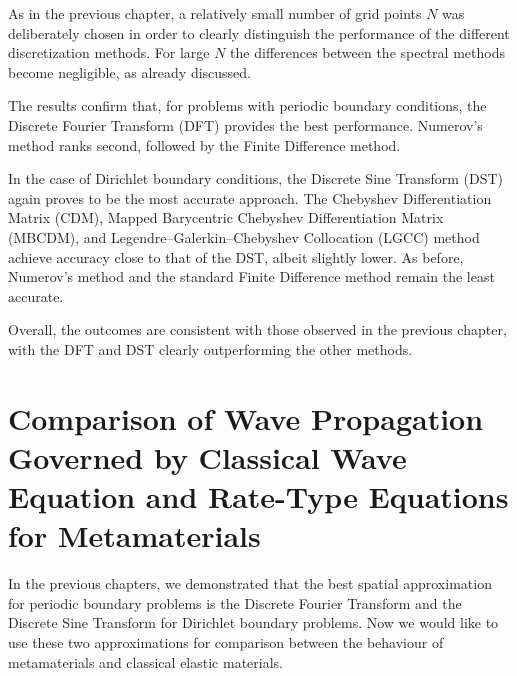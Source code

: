 \documentclass[11pt,a4paper,oneside,openright]{report} %
\begin{document}
As in the previous chapter, a relatively small number of grid points $N$ was deliberately chosen in order to clearly distinguish the performance of the different discretization methods. For large $N$ the differences between the spectral methods become negligible, as already discussed.

The results confirm that, for problems with periodic boundary conditions, the Discrete Fourier Transform (DFT) provides the best performance. Numerov's method ranks second, followed by the Finite Difference method.

In the case of Dirichlet boundary conditions, the Discrete Sine Transform (DST) again proves to be the most accurate approach. The Chebyshev Differentiation Matrix (CDM), Mapped Barycentric Chebyshev Differentiation Matrix (MBCDM), and Legendre--Galerkin--Chebyshev Collocation (LGCC) method achieve accuracy close to that of the DST, albeit slightly lower. As before, Numerov's method and the standard Finite Difference method remain the least accurate.

Overall, the outcomes are consistent with those observed in the previous chapter, with the DFT and DST clearly outperforming the other methods.



\chapter{Comparison of Wave Propagation Governed by Classical Wave Equation and Rate-Type Equations for Metamaterials}
\noindent
In the previous chapters, we demonstrated that the best spatial approximation for periodic boundary problems is the Discrete Fourier Transform and the Discrete Sine Transform for Dirichlet boundary problems. Now we would like to use these two approximations for comparison between the behaviour of metamaterials and classical elastic materials.
\end{document}
